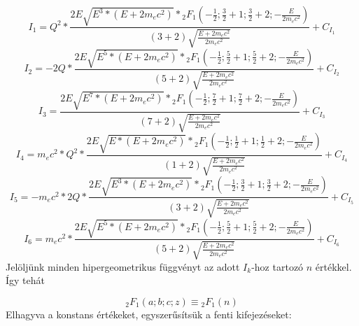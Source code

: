 \begin{equation} \label{eq:42}
I_{1}
=
Q^{2}
*
\frac{2 E \sqrt{E^{3} * \left( E + 2m_{e}c^{2} \right)} * {}_{2}F_{1} \left( -\frac{1}{2}; \frac{3}{2} + 1; \frac{3}{2} + 2; -\frac{E}{2m_{e}c^{2}} \right)}{\left( 3 + 2 \right) \sqrt{\frac{E + 2m_{e}c^{2}}{2m_{e}c^{2}}}} + C_{I_{1}}
\end{equation}
\begin{equation} \label{eq:43}
I_{2}
=
- 2Q
*
\frac{2 E \sqrt{E^{5} * \left( E + 2m_{e}c^{2} \right)} * {}_{2}F_{1} \left( -\frac{1}{2}; \frac{5}{2} + 1; \frac{5}{2} + 2; -\frac{E}{2m_{e}c^{2}} \right)}{\left( 5 + 2 \right) \sqrt{\frac{E + 2m_{e}c^{2}}{2m_{e}c^{2}}}} + C_{I_{2}}
\end{equation}
\begin{equation} \label{eq:44}
I_{3}
=
\frac{2 E \sqrt{E^{7} * \left( E + 2m_{e}c^{2} \right)} * {}_{2}F_{1} \left( -\frac{1}{2}; \frac{7}{2} + 1; \frac{7}{2} + 2; -\frac{E}{2m_{e}c^{2}} \right)}{\left( 7 + 2 \right) \sqrt{\frac{E + 2m_{e}c^{2}}{2m_{e}c^{2}}}} + C_{I_{3}}
\end{equation}
\begin{equation} \label{eq:45}
I_{4}
=
m_{e}c^{2} * Q^{2}
*
\frac{2 E \sqrt{E * \left( E + 2m_{e}c^{2} \right)} * {}_{2}F_{1} \left( -\frac{1}{2}; \frac{1}{2} + 1; \frac{1}{2} + 2; -\frac{E}{2m_{e}c^{2}} \right)}{\left( 1 + 2 \right) \sqrt{\frac{E + 2m_{e}c^{2}}{2m_{e}c^{2}}}} + C_{I_{4}}
\end{equation}
\begin{equation} \label{eq:46}
I_{5}
=
- m_{e}c^{2} * 2Q
*
\frac{2 E \sqrt{E^{3} * \left( E + 2m_{e}c^{2} \right)} * {}_{2}F_{1} \left( -\frac{1}{2}; \frac{3}{2} + 1; \frac{3}{2} + 2; -\frac{E}{2m_{e}c^{2}} \right)}{\left( 3 + 2 \right) \sqrt{\frac{E + 2m_{e}c^{2}}{2m_{e}c^{2}}}} + C_{I_{5}}
\end{equation}
\begin{equation} \label{eq:47}
I_{6}
=
m_{e}c^{2}
*
\frac{2 E \sqrt{E^{5} * \left( E + 2m_{e}c^{2} \right)} * {}_{2}F_{1} \left( -\frac{1}{2}; \frac{5}{2} + 1; \frac{5}{2} + 2; -\frac{E}{2m_{e}c^{2}} \right)}{\left( 5 + 2 \right) \sqrt{\frac{E + 2m_{e}c^{2}}{2m_{e}c^{2}}}} + C_{I_{6}}
\end{equation}
Jelöljünk minden hipergeometrikus függvényt az adott $I_{k}$-hoz tartozó $n$ értékkel. Így tehát

\begin{equation} \label{eq:48}
{}_{2}F_{1} \left( a; b; c; z \right)
\equiv
{}_{2}F_{1} \left( n \right)
\end{equation}
Elhagyva a konstans értékeket, egyszerűsítsük a fenti kifejezéseket:

